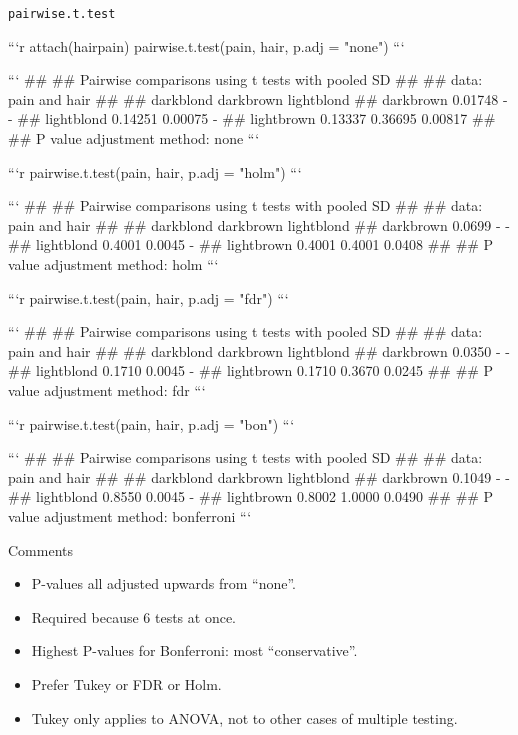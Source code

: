 \documentclass[ignorenonframetext,]{beamer}
\begin{document}
\begin{frame}{\texttt{pairwise.t.test}}
\protect\hypertarget{pairwise.t.test}{}

\begin{multicols}{2}
{\tiny

```r
attach(hairpain)
pairwise.t.test(pain, hair, p.adj = "none")
```

```
## 
##  Pairwise comparisons using t tests with pooled SD 
## 
## data:  pain and hair 
## 
##            darkblond darkbrown lightblond
## darkbrown  0.01748   -         -         
## lightblond 0.14251   0.00075   -         
## lightbrown 0.13337   0.36695   0.00817   
## 
## P value adjustment method: none
```

```r
pairwise.t.test(pain, hair, p.adj = "holm")
```

```
## 
##  Pairwise comparisons using t tests with pooled SD 
## 
## data:  pain and hair 
## 
##            darkblond darkbrown lightblond
## darkbrown  0.0699    -         -         
## lightblond 0.4001    0.0045    -         
## lightbrown 0.4001    0.4001    0.0408    
## 
## P value adjustment method: holm
```

   


```r
pairwise.t.test(pain, hair, p.adj = "fdr")
```

```
## 
##  Pairwise comparisons using t tests with pooled SD 
## 
## data:  pain and hair 
## 
##            darkblond darkbrown lightblond
## darkbrown  0.0350    -         -         
## lightblond 0.1710    0.0045    -         
## lightbrown 0.1710    0.3670    0.0245    
## 
## P value adjustment method: fdr
```

```r
pairwise.t.test(pain, hair, p.adj = "bon")
```

```
## 
##  Pairwise comparisons using t tests with pooled SD 
## 
## data:  pain and hair 
## 
##            darkblond darkbrown lightblond
## darkbrown  0.1049    -         -         
## lightblond 0.8550    0.0045    -         
## lightbrown 0.8002    1.0000    0.0490    
## 
## P value adjustment method: bonferroni
```

 
}
\end{multicols}

\end{frame}

\begin{frame}{Comments}
\protect\hypertarget{comments-13}{}

\begin{itemize}
\item
  P-values all adjusted upwards from ``none''.
\item
  Required because 6 tests at once.
\item
  Highest P-values for Bonferroni: most ``conservative''.
\item
  Prefer Tukey or FDR or Holm.
\item
  Tukey only applies to ANOVA, not to other cases of multiple testing.
\end{itemize}

\end{frame}
\end{document}
